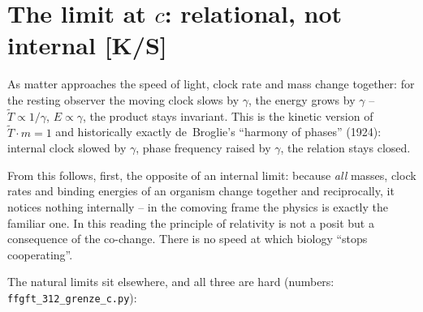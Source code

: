 \documentclass[11pt]{report}
\begin{document}
\section{The limit at $c$: relational, not internal [K/S]}

As matter approaches the speed of light, clock rate and mass change
together: for the resting observer the moving clock slows by
$\gamma$, the energy grows by $\gamma$ --
$\tilde T \propto 1/\gamma$, $E \propto \gamma$, the product stays
invariant. This is the kinetic version of $\tilde T \cdot m = 1$
and historically exactly de~Broglie's \enquote{harmony of phases}
(1924): internal clock slowed by $\gamma$, phase frequency raised
by $\gamma$, the relation stays closed.

From this follows, first, the opposite of an internal limit:
because \emph{all} masses, clock rates and binding energies of an
organism change together and reciprocally, it notices nothing
internally -- in the comoving frame the physics is exactly the
familiar one. In this reading the principle of relativity is not a
posit but a consequence of the co-change. There is no speed at
which biology \enquote{stops cooperating}.

The natural limits sit elsewhere, and all three are hard (numbers:
\texttt{ffgft\_312\_grenze\_c.py}):
\end{document}
